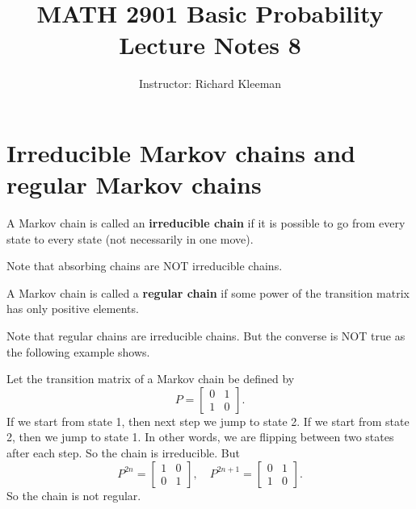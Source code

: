 


\title{MATH 2901 Basic Probability Lecture Notes 8}
\author{Instructor: Richard Kleeman}
\date{}
\maketitle


\section{Irreducible Markov chains and regular Markov chains}
\begin{definition}
A Markov chain is called an \textbf{irreducible chain} if it is possible to go from every state to every state (not necessarily in one move).
\end{definition}

\begin{remark}
Note that absorbing chains are NOT irreducible chains.
\end{remark}

\begin{definition}
A Markov chain is called a \textbf{regular chain} if some power of the transition matrix has only positive elements. 
\end{definition}

\begin{remark}
Note that regular chains are irreducible chains. But the converse is NOT true as the following example shows.
\end{remark}

\begin{example}
Let the transition matrix of a Markov chain be defined by
\begin{equation*}
    P = \begin{bmatrix} 0 & 1 \\ 1 & 0 \end{bmatrix}.
\end{equation*}
If we start from state 1, then next step we jump to state 2. If we start from state 2, then we jump to state 1. In other words, we are flipping between two states after each step. So the chain is irreducible. But 
\begin{equation*}
    P^{2n} = \begin{bmatrix} 1 & 0 \\ 0 & 1 \end{bmatrix}, \quad 
    P^{2n+1} = \begin{bmatrix} 0 & 1 \\ 1 & 0 \end{bmatrix}.
\end{equation*}
So the chain is not regular.
\end{example}

